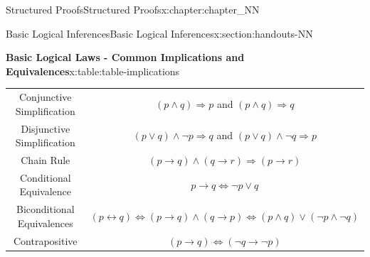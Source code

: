 \documentclass[oneside,10pt,]{book}
\numberwithin{equation}{section}
\newcommand{\hrulemedium}{\noalign{\hrule height 0.07em}}
\begin{document}
\begin{chapterptx}{Structured Proofs}{}{Structured Proofs}{}{}{x:chapter:chapter_NN}
\begin{sectionptx}{Basic Logical Inferences}{}{Basic Logical Inferences}{}{}{x:section:handouts-NN}
\begin{tableptx}{\textbf{Basic Logical Laws - Common Implications and Equivalences}}{x:table:table-implications}{}
{\begin{tabular}{cc}
Conjunctive Simplification&\((p \land  q) \Rightarrow  p\) and \((p \land  q) \Rightarrow  q\)\tabularnewline\hrulemedium
Disjunctive Simplification&\((p \lor  q) \land  \neg p \Rightarrow  q\) and \((p \lor q) \land \neg q\Rightarrow p\)\tabularnewline\hrulemedium
Chain Rule&\((p \to  q) \land  ( q \rightarrow  r) \Rightarrow  (p\to  r)\)\tabularnewline\hrulemedium
Conditional Equivalence&\(p \rightarrow  q \Leftrightarrow  \neg p \lor  q\)\tabularnewline\hrulemedium
Biconditional Equivalences&\((p \leftrightarrow  q) \Leftrightarrow  (p\rightarrow q) \land  (q \rightarrow  p)\Leftrightarrow (p \land  q) \lor  (\neg p \land  \neg q)\)\tabularnewline\hrulemedium
Contrapositive&\((p\to q) \Leftrightarrow (\neg q \to \neg p)\)
\end{tabular}
}%
\end{tableptx}%
\end{sectionptx}
\end{chapterptx}
%
%
\typeout{************************************************}
\typeout{************************************************}
%
\end{document}
